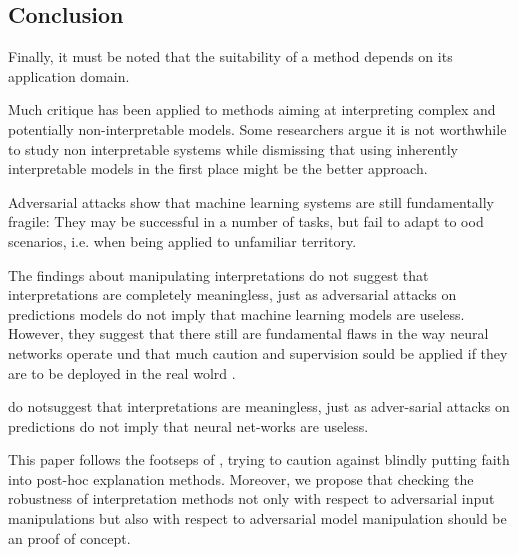 \subsection{Conclusion}


Finally, it must be noted that the suitability of a method depends on its application domain. 


Much critique has been applied to methods aiming at interpreting complex and potentially non-interpretable models. 
Some researchers argue it is not worthwhile to study non interpretable systems while dismissing that using inherently interpretable models in the first place might be the better approach. 

Adversarial attacks show that machine learning systems are still fundamentally fragile: They may be successful in a number of tasks, but fail to adapt to ood scenarios, i.e. when being applied to unfamiliar territory. 

 The findings about manipulating interpretations do not suggest that interpretations are completely meaningless, just as adversarial attacks on predictions models do not imply that machine learning models are useless. However, they suggest that there still are fundamental flaws in the way neural networks operate und that much caution and supervision sould be applied if they are to be deployed in the real wolrd .


do  notsuggest that interpretations are meaningless, just as adver-sarial  attacks  on  predictions  do  not  imply  that  neural  net-works are useless. 

This paper follows the footseps of \cite{lipton2018mythos}, trying to caution against blindly putting faith into post-hoc explanation methods. 
Moreover, we propose that checking the robustness of interpretation methods not only with respect to adversarial input manipulations but also with respect to adversarial model manipulation should be an proof of concept. 




